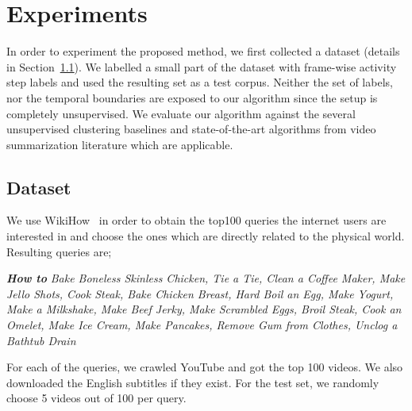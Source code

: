 

\section{Experiments}
In order to experiment the proposed method, we first collected a dataset (details in Section~\ref{dataset:sec}). We labelled a small part of the dataset with frame-wise activity step labels and used the resulting set as a test corpus. Neither the set of labels, nor the temporal boundaries are exposed to our algorithm since the setup is completely unsupervised. We evaluate our algorithm against the several unsupervised clustering baselines and state-of-the-art algorithms from video summarization literature which are applicable.
\subsection{Dataset}
\label{dataset:sec}
We use WikiHow~\cite{wikiHow} in order to obtain the top100 queries the internet users are interested in and choose the ones which are
directly related to the physical world. Resulting queries are;

\emph{\textbf{How to}}\footnotesize
\emph{Bake Boneless Skinless Chicken, Tie a Tie, Clean a Coffee Maker, Make Jello Shots, Cook Steak, Bake Chicken Breast, Hard Boil an Egg, Make Yogurt, Make a Milkshake, Make Beef Jerky, Make Scrambled Eggs, Broil Steak, Cook an Omelet, Make Ice Cream, Make Pancakes, Remove Gum from Clothes, Unclog a Bathtub Drain}
\normalsize

For each of the queries, we crawled YouTube and got the top 100 videos. We also downloaded the English subtitles if they exist. For the test set, we randomly choose 5 videos out of 100 per query.

\vspace{-1mm}
